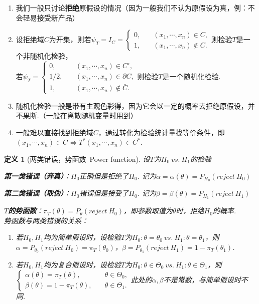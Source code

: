 \documentclass[12pt, a4paper, oneside]{ctexart}
\newtheorem{definition}[theorem]{定义}
\numberwithin{equation}{section}  %
\newenvironment{remark}{\begin{enumerate}[label=\textbf{注\arabic*.}]}{\end{enumerate}}
\begin{document}
\begin{remark}
    \item 我们一般只讨论\textbf{拒绝}原假设的情况（因为一般我们不认为原假设为真，例：不会轻易接受新产品）
    \item 设拒绝域$C$为开集，则若$\psi_T=I_C = \begin{cases}
        0,&\quad (x_1,\cdots,x_n)\in C,\\ 1,&\quad (x_1,\cdots,x_n)\notin C.
    \end{cases}$则检验$T$是一个非随机化检验，\\
    若$\psi_T = \begin{cases}
        0,&\quad (x_1,\cdots,x_n)\in C^\circ,\\
        1/2,&\quad (x_1,\cdots,x_n)\in \partial C,\\
        1,&\quad (x_1,\cdots,x_n)\notin\bar C.
    \end{cases}$则检验$T$是一个随机化检验.
    \item 随机化检验一般是带有主观色彩得，因为它会以一定的概率去拒绝原假设，并不果断.（一般在离散随机变量时用到）
    \item 一般难以直接找到拒绝域$C$，通过转化为检验统计量找等价条件，即\\$(x_1,\cdots,x_n)\in C\iff T^*(x_1,\cdots,x_n)\in C^*$.
\end{remark}
\begin{definition}[两类错误，势函数\ Power function]设$T$为$H_0\ vs.\ H_1$的检验

    \textbf{第一类错误（弃真）}：$H_0$正确但是拒绝了$H_0$. 记为$\alpha=\alpha(\theta)=P_{H_0}(reject\ H_0)$

    \textbf{第二类错误（取伪）}：$H_0$错误但是接受了$H_0$. 记为$\beta=\beta(\theta)=P_{H_1}(reject\ H_1)$

    \textbf{$T$的势函数}：$\pi_T(\theta) = P_\theta(reject\ H_0)$，即参数取值为$\theta$时，拒绝$H_0$的概率.\\
    势函数与两类错误的关系：
    \begin{enumerate}
        \item 若$H_0,H_1$均为简单假设时，设检验$T$为$H_0:\theta=\theta_0\ vs.\ H_1:\theta=\theta_1$，则$\alpha = P_{\theta_0}(reject\ H_0) = \pi_T(\theta_0)$，$\beta = P_{\theta_1}(reject\ H_1) = 1-\pi_T(\theta_1)$.
        \item 若$H_0,H_1$均为复合假设时，设检验$T$为$H_0:\theta\in \Theta_0\ vs.\ H_1:\theta\in \Theta_1$，则$\begin{cases}
            \alpha(\theta) = \pi_{T}(\theta),&\quad \theta\in \Theta_0,\\
            \beta(\theta) = 1-\pi_{T}(\theta),&\quad \theta\in \Theta_1.
        \end{cases}$此处的$\alpha,\beta$不是常数，与简单假设时不同.
    \end{enumerate}
\end{definition}
\end{document}
